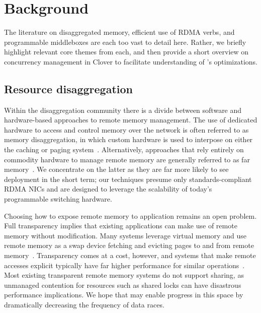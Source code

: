 \section{Background}

The literature on disaggregated memory, efficient use of RDMA verbs,
and programmable middleboxes are each too vast to detail here.
Rather, we briefly highlight relevant core themes from each, and then
provide a short overview on concurrency management in Clover to
facilitate understanding of \sword's optimizations.

\subsection{Resource disaggregation}

Within the disaggregation community there is a divide between software
and hardware-based approaches to remote memory management.  The use of
dedicated hardware to access and control memory over the network is
often referred to as memory disaggregation, in which custom hardware
is used to interpose on either the caching or paging
system~\cite{dredbox,rethinking}.  Alternatively, approaches that rely
entirely on commodity hardware to manage remote memory are generally
referred to as far memory~\cite{reigons,fastswap, legoos,
  clover, lite}.  We concentrate on the latter as they are far more
likely to see deployment in the short term; our techniques presume
only standards-compliant RDMA NICs and are designed to leverage the
scalability of today's programmable switching hardware.

Choosing how to expose remote memory to application remains an open
problem. Full transparency implies that existing applications can make
use of remote memory without modification. Many systems leverage
virtual memory and use remote memory as a swap device fetching and
evicting pages to and from remote
memory~\cite{fastswap,GMS,infiniswap,leap,ramcloud}. Transparency
comes at a cost, however, and systems that make remote accesses
explicit typically have far higher performance for similar
operations~\cite{aifm}.  Most existing transparent remote memory
systems do not support sharing, as unmanaged contention for resources
such as shared locks can have disastrous performance implications.  We
hope that {\sword} may enable progress in this space by dramatically
decreasing the frequency of data races.



